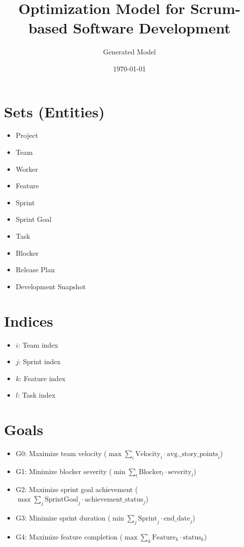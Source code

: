 \documentclass{article}
\title{Optimization Model for Scrum-based Software Development}
\author{Generated Model}
\date{\today}
\begin{document}
\maketitle
\tableofcontents

\section{Sets (Entities)}
\begin{itemize}
    \item Project
    \item Team
    \item Worker
    \item Feature
    \item Sprint
    \item Sprint Goal
    \item Task
    \item Blocker
    \item Release Plan
    \item Development Snapshot
\end{itemize}

\section{Indices}
\begin{itemize}
    \item $i$: Team index
    \item $j$: Sprint index
    \item $k$: Feature index
    \item $l$: Task index
\end{itemize}

\section{Goals}
\begin{itemize}
    \item G0: Maximize team velocity ($\max \sum_{i} \text{Velocity}_{i} \cdot \text{avg.\_story\_points}_{i}$)
    \item G1: Minimize blocker severity ($\min \sum_{l} \text{Blocker}_{l} \cdot \text{severity}_{l}$)
    \item G2: Maximize sprint goal achievement ($\max \sum_{j} \text{SprintGoal}_{j} \cdot \text{achievement\_status}_{j}$)
    \item G3: Minimize sprint duration ($\min \sum_{j} \text{Sprint}_{j} \cdot \text{end\_date}_{j}$)
    \item G4: Maximize feature completion ($\max \sum_{k} \text{Feature}_{k} \cdot \text{status}_{k}$)
\end{itemize}
\end{document}
